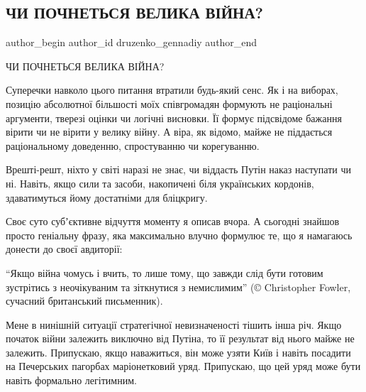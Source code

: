  
 
 
 
 
 
\subsection{ЧИ ПОЧНЕТЬСЯ ВЕЛИКА ВІЙНА?}
\label{sec:13_02_2022.fb.druzenko_gennadiy.1.chy_pochnetsja_velyka_vijna}
 
\ifcmt
 author_begin
   author_id druzenko_gennadiy
 author_end
\fi

ЧИ ПОЧНЕТЬСЯ ВЕЛИКА ВІЙНА?

Суперечки навколо цього питання втратили будь-який сенс. Як і на виборах,
позицію абсолютної більшості моїх співгромадян формують не раціональні
аргументи, тверезі оцінки чи логічні висновки. Її формує підсвідоме бажання
вірити чи не вірити у велику війну. А віра, як відомо, майже не піддається
раціональному доведенню, спростуванню чи корегуванню.


Врешті-решт, ніхто у світі наразі не знає, чи віддасть Путін наказ наступати чи
ні. Навіть, якщо сили та засоби, накопичені біля українських кордонів,
здаватимуться йому достатніми для бліцкригу.

Своє суто субʼєктивне відчуття моменту я описав вчора. А сьогодні знайшов
просто геніальну фразу, яка максимально влучно формулює те, що я намагаюсь
донести до своєї авдиторії:

\enquote{Якщо війна чомусь і вчить, то лише тому, що завжди слід бути готовим
зустрітись з неочікуваним та зіткнутися з немислимим} (© Christopher Fowler,
сучасний британський письменник).

Мене в нинішній ситуації стратегічної невизначеності тішить інша річ. Якщо
початок війни залежить виключно від Путіна, то її результат від нього майже не
залежить. Припускаю, якщо наважиться, він може узяти Київ і навіть посадити на
Печерських пагорбах маріонетковий уряд. Припускаю, що цей уряд може бути навіть
формально легітимним. 

